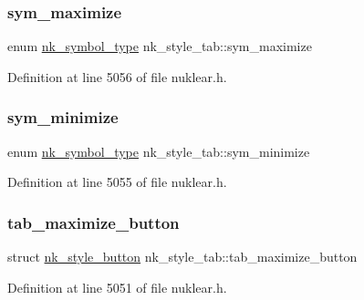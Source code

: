 \subsubsection{\texorpdfstring{sym\+\_\+maximize}{sym\_maximize}}
{\footnotesize\ttfamily enum \mbox{\hyperlink{nuklear_8h_a29b4aaa400d0ce28aea3c8c9c372ac07}{nk\+\_\+symbol\+\_\+type}} nk\+\_\+style\+\_\+tab\+::sym\+\_\+maximize}



Definition at line 5056 of file nuklear.\+h.

\mbox{\label{structnk__style__tab_a50977cd5e3328ce1bed6e7a7abaf7855}} 
\subsubsection{\texorpdfstring{sym\+\_\+minimize}{sym\_minimize}}
{\footnotesize\ttfamily enum \mbox{\hyperlink{nuklear_8h_a29b4aaa400d0ce28aea3c8c9c372ac07}{nk\+\_\+symbol\+\_\+type}} nk\+\_\+style\+\_\+tab\+::sym\+\_\+minimize}



Definition at line 5055 of file nuklear.\+h.

\mbox{\label{structnk__style__tab_a249d7729ae42ddeb8a7791e359d05c19}} 
\subsubsection{\texorpdfstring{tab\+\_\+maximize\+\_\+button}{tab\_maximize\_button}}
{\footnotesize\ttfamily struct \mbox{\hyperlink{structnk__style__button}{nk\+\_\+style\+\_\+button}} nk\+\_\+style\+\_\+tab\+::tab\+\_\+maximize\+\_\+button}



Definition at line 5051 of file nuklear.\+h.

\mbox{\label{structnk__style__tab_a1b7600272b1e49296d89e68fb993cae2}} 
